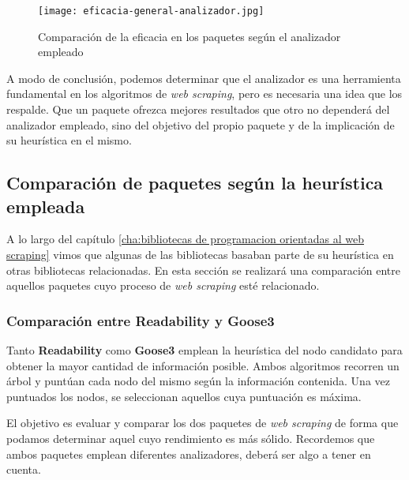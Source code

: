 \begin{figure}[tphb]
    \centering
    \texttt{[image: eficacia-general-analizador.jpg]}
    \caption{Comparación de la eficacia en los paquetes según el analizador empleado}
    \label{img:comparacion de la eficacia en los paquetes segun el analizador empleado}
\end{figure}

A modo de conclusión, podemos determinar que el analizador es una herramienta fundamental en los algoritmos
de \emph{web scraping}, pero es necesaria una idea que los respalde. Que un paquete ofrezca mejores
resultados que otro no dependerá del analizador empleado, sino del objetivo del propio paquete y de la
implicación de su heurística en el mismo.

\subsection{Comparación de paquetes según la heurística empleada}
\label{subsec:comparacion de paquetes segun la heuristica empleada}

A lo largo del capítulo \ref{cha:bibliotecas de programacion orientadas al web scraping} vimos que algunas
de las bibliotecas basaban parte de su heurística en otras bibliotecas relacionadas. En esta sección se
realizará una comparación entre aquellos paquetes cuyo proceso de \emph{web scraping} esté relacionado.
 
\subsubsection{Comparación entre Readability y Goose3}
\label{subsec:comparacion entre readability y goose3}

Tanto \textbf{Readability} como \textbf{Goose3} emplean la heurística del nodo candidato para obtener la
mayor cantidad de información posible. Ambos algoritmos recorren un árbol y puntúan cada nodo del mismo
según la información contenida. Una vez puntuados los nodos, se seleccionan aquellos cuya puntuación es
máxima.

El objetivo es evaluar y comparar los dos paquetes de \emph{web scraping} de forma que podamos determinar
aquel cuyo rendimiento es más sólido. Recordemos que ambos paquetes emplean diferentes analizadores, deberá 
ser algo a tener en cuenta.

